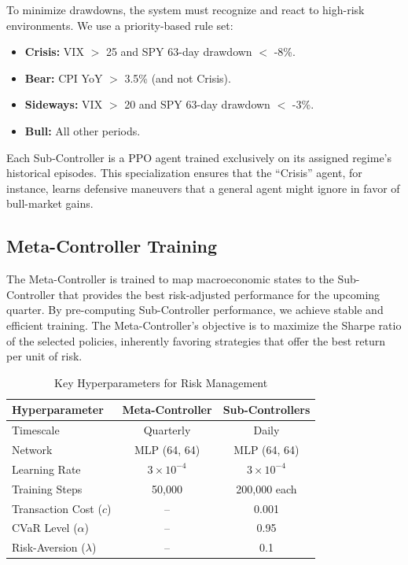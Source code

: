 \documentclass[conference]{IEEEtran}
\begin{document}
To minimize drawdowns, the system must recognize and react to high-risk environments. We use a priority-based rule set:

\begin{itemize}
\item \textbf{Crisis:} VIX $>$ 25 and SPY 63-day drawdown $<$ -8\%.
\item \textbf{Bear:} CPI YoY $>$ 3.5\% (and not Crisis).
\item \textbf{Sideways:} VIX $>$ 20 and SPY 63-day drawdown $<$ -3\%.
\item \textbf{Bull:} All other periods.
\end{itemize}

Each Sub-Controller is a PPO agent trained exclusively on its assigned regime's historical episodes. This specialization ensures that the ``Crisis'' agent, for instance, learns defensive maneuvers that a general agent might ignore in favor of bull-market gains.

\subsection{Meta-Controller Training}

The Meta-Controller is trained to map macroeconomic states to the Sub-Controller that provides the best risk-adjusted performance for the upcoming quarter. By pre-computing Sub-Controller performance, we achieve stable and efficient training. The Meta-Controller's objective is to maximize the Sharpe ratio of the selected policies, inherently favoring strategies that offer the best return per unit of risk.

\begin{table}[h]
\centering
\caption{Key Hyperparameters for Risk Management}
\label{tab:hyperparams}
\begin{tabular}{@{}lcc@{}}
\toprule
\textbf{Hyperparameter} & \textbf{Meta-Controller} & \textbf{Sub-Controllers} \\
\midrule
Timescale & Quarterly & Daily \\
Network & MLP (64, 64) & MLP (64, 64) \\
Learning Rate & $3\times10^{-4}$ & $3\times10^{-4}$ \\
Training Steps & 50,000 & 200,000 each \\
Transaction Cost ($c$) & -- & 0.001 \\
CVaR Level ($\alpha$) & -- & 0.95 \\
Risk-Aversion ($\lambda$) & -- & 0.1 \\
\bottomrule
\end{tabular}
\end{table}
\end{document}
